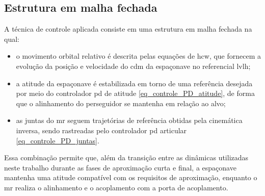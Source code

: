 \subsection{Estrutura em malha fechada}

A técnica de controle aplicada consiste em uma estrutura em malha fechada na qual:

\begin{itemize}
  \item o movimento orbital relativo é descrita pelas equações de \gls{hcw}, que fornecem a evolução da posição e velocidade do \gls{cdm} da espaçonave no referencial \gls{lvlh};
  \item a atitude da espaçonave é estabilizada em torno de uma referência desejada por meio do controlador \gls{pd} de atitude \eqref{eq_controle_PD_atitude}, de forma que o alinhamento do perseguidor se mantenha em relação ao alvo;
  \item as juntas do \gls{mr} seguem trajetórias de referência obtidas pela cinemática inversa, sendo rastreadas pelo controlador \gls{pd} articular \eqref{eq_controle_PD_juntas}.
\end{itemize}

Essa combinação permite que, além da transição entre as dinâmicas utilizadas neste trabalho durante as fases de aproximação curta e final, a espaçonave mantenha uma atitude compatível com os requisitos de aproximação, enquanto o \gls{mr} realiza o alinhamento e o acoplamento com a porta de acoplamento.
